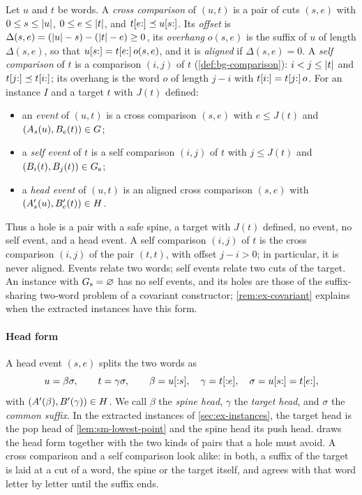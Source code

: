 \begin{definition}\label{def:ex-events}
Let $u$ and $t$ be words. A \emph{cross comparison} of $(u,t)$ is a pair of
cuts $(s,e)$ with $0\le s\le\lvert u\rvert$, $0\le e\le\lvert t\rvert$, and
$t[e{:}]\preceq u[s{:}]$. Its \emph{offset} is
$\Delta(s,e)=(\lvert u\rvert-s)-(\lvert t\rvert-e)\ge0$, its \emph{overhang} $o(s,e)$ is the
suffix of $u$ of length $\Delta(s,e)$, so that $u[s{:}]=t[e{:}]\,o(s,e)$,
and it is \emph{aligned} if $\Delta(s,e)=0$. A \emph{self comparison} of $t$
is a comparison $(i,j)$ of $t$ (\cref{def:bg-comparison}): $i<j\le\lvert t\rvert$ and
$t[j{:}]\preceq t[i{:}]$; its overhang is the word $o$ of length $j-i$ with
$t[i{:}]=t[j{:}]\,o$. For an instance $I$ and a target $t$ with $J(t)$
defined:
\begin{itemize}[leftmargin=*]
\item an \emph{event} of $(u,t)$ is a cross comparison $(s,e)$ with
  $e\le J(t)$ and $(A_s(u),B_e(t))\in G$;
\item a \emph{self event} of $t$ is a self comparison $(i,j)$ of $t$ with
  $j\le J(t)$ and $(B_i(t),B_j(t))\in G_{\mathrm{s}}$;
\item a \emph{head event} of $(u,t)$ is an aligned cross comparison $(s,e)$
  with $(A'_s(u),B'_e(t))\in H$.
\end{itemize}
\end{definition}

Thus a hole is a pair with a safe spine, a target with $J(t)$ defined, no
event, no self event, and a head event. A self comparison $(i,j)$ of $t$ is
the cross comparison $(i,j)$ of the pair $(t,t)$, with offset $j-i>0$; in particular, it
is never aligned. Events relate two words; self events relate two cuts of the
target. An instance with $G_{\mathrm{s}}=\varnothing$ has no self events, and its holes
are those of the suffix-sharing two-word problem of a covariant constructor;
\cref{rem:ex-covariant} explains when the extracted instances have this form.

\paragraph{Head form}
A head event $(s,e)$ splits the two words as
\[
 u=\beta\sigma,\qquad t=\gamma\sigma,\qquad
 \beta=u[{:}s],\quad\gamma=t[{:}e],\quad\sigma=u[s{:}]=t[e{:}],
\]
with $(A'(\beta),B'(\gamma))\in H$. We call $\beta$ the \emph{spine head},
$\gamma$ the \emph{target head}, and $\sigma$ the \emph{common suffix}. In the
extracted instances of \cref{sec:ex-instances}, the target head is the pop
head of \cref{lem:sm-lowest-point} and the spine head its push head.
 draws the head form together with the two kinds of pairs
that a hole must avoid. A cross comparison and a self comparison look alike:
in both, a suffix of the target is laid at a cut of a word, the spine or the
target itself, and agrees with that word letter by letter until the suffix
ends.

